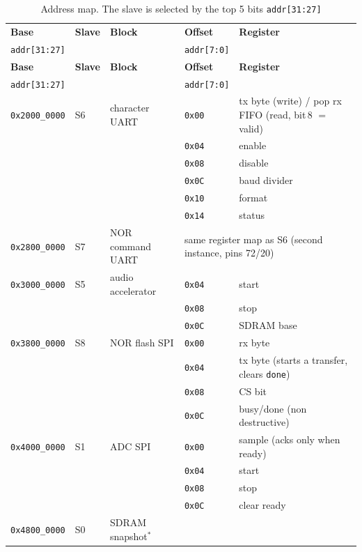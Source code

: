 \documentclass[a4paper,10pt]{article}
\begin{document}
{\footnotesize
\setlength{\LTleft}{\fill}\setlength{\LTright}{\fill}
\begin{longtable}{l l l l p{6.7cm}}
\caption{Address map. The slave is selected by the top 5 bits \texttt{addr[31:27]}}
\label{tab:addrmap}\\
\toprule
\textbf{Base} & \textbf{Slave} & \textbf{Block} & \textbf{Offset} & \textbf{Register} \\
\texttt{addr[31:27]} & & & \texttt{addr[7:0]} & \\
\midrule
\endfirsthead
\toprule
\textbf{Base} & \textbf{Slave} & \textbf{Block} & \textbf{Offset} & \textbf{Register} \\
\texttt{addr[31:27]} & & & \texttt{addr[7:0]} & \\
\midrule
\endhead
\bottomrule
\endlastfoot
\texttt{0x2000\_0000} & S6 & character UART
 & \texttt{0x00} & tx byte (write) / pop rx FIFO (read, bit\,8 $=$ valid) \\
 & & & \texttt{0x04} & enable \\
 & & & \texttt{0x08} & disable \\
 & & & \texttt{0x0C} & baud divider \\
 & & & \texttt{0x10} & format \\
 & & & \texttt{0x14} & status \\
\midrule
\texttt{0x2800\_0000} & S7 & NOR command UART
 & \multicolumn{2}{l}{same register map as S6 (second instance, pins 72/20)} \\
\midrule
\texttt{0x3000\_0000} & S5 & audio accelerator
 & \texttt{0x04} & start \\
 & & & \texttt{0x08} & stop \\
 & & & \texttt{0x0C} & SDRAM base \\
\midrule
\texttt{0x3800\_0000} & S8 & NOR flash SPI
 & \texttt{0x00} & rx byte \\
 & & & \texttt{0x04} & tx byte (starts a transfer, clears \texttt{done}) \\
 & & & \texttt{0x08} & CS bit \\
 & & & \texttt{0x0C} & busy/done (non destructive) \\
\midrule
\texttt{0x4000\_0000} & S1 & ADC SPI
 & \texttt{0x00} & sample (acks only when ready) \\
 & & & \texttt{0x04} & start \\
 & & & \texttt{0x08} & stop \\
 & & & \texttt{0x0C} & clear ready \\
\midrule
\texttt{0x4800\_0000} & S0 & SDRAM snapshot$^{\ast}$

\end{longtable}}
\end{document}
